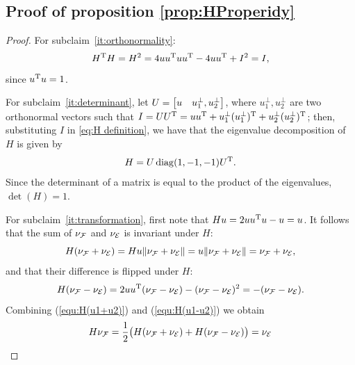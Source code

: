 \documentclass[journal]{IEEEtran}  %
\begin{document}
\subsection{Proof of proposition \ref{prop:HProperidy}}
\begin{proof}
    For subclaim~\ref{it:orthonormality}:
    \begin{equation}
      H^\mathrm{T} H=H^2=4uu^\mathrm{T} u u^\mathrm{T} - 4uu^\mathrm{T} +I^2=I,
    \end{equation}
    since $u^\mathrm{T} u=1$.

    For subclaim~\ref{it:determinant}, let $U=\begin{bmatrix}u & u^\bot_{1},u^\bot_{2}\end{bmatrix}$, where $u^\bot_{1},u^\bot_{2}$ are two orthonormal vectors such that $I=UU^\mathrm{T}=uu^\mathrm{T} + u^\bot_{1}(u^\bot_{1})^\mathrm{T}+u^\bot_{2}(u^\bot_{2})^\mathrm{T}$; then, substituting $I$ in \eqref{eq:H definition}, we have that the eigenvalue decomposition of $H$ is given by
    \begin{equation}
      H=U\operatorname{diag}(1,-1,-1) U^\mathrm{T}.
    \end{equation}
    Since the determinant of a matrix is equal to the product of the eigenvalues, $\det(H)=1$.

    For subclaim~\ref{it:transformation}, first note that $Hu=2uu^\mathrm{T} u - u=u$.
    It follows that the sum of $\nu_{\mathcal{F}}$ and $\nu_{\mathcal{E}}$ is invariant under $H$:
    \begin{equation}\label{equ:H(u1+u2)}
      H(\nu_{\mathcal{F}}+\nu_{\mathcal{E}})=H u \lVert\nu_{\mathcal{F}}+\nu_{\mathcal{E}}\rVert
      = u\lVert\nu_{\mathcal{F}}+\nu_{\mathcal{E}}\rVert =\nu_{\mathcal{F}}+\nu_{\mathcal{E}},
    \end{equation}
    and that their difference is flipped under $H$:
    \begin{equation}\label{equ:H(u1-u2)}
      H(\nu_{\mathcal{F}}-\nu_{\mathcal{E}}) = 2uu^\mathrm{T} (\nu_{\mathcal{F}}-\nu_{\mathcal{E}}) - (\nu_{\mathcal{F}}-\nu_{\mathcal{E}})^2 = -(\nu_{\mathcal{F}}-\nu_{\mathcal{E}}).
    \end{equation}
    Combining (\ref{equ:H(u1+u2)}) and (\ref{equ:H(u1-u2)}) we obtain
    \begin{equation}
      H\nu_{\mathcal{F}} = \frac{1}{2}\bigl(H(\nu_{\mathcal{F}}+\nu_{\mathcal{E}})+H(\nu_{\mathcal{F}}-\nu_{\mathcal{E}})\bigr)
      = \nu_{\mathcal{E}}
    \end{equation}
\end{proof}
\end{document}
